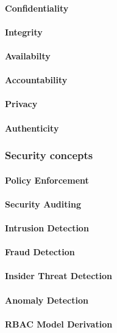 \documentclass[runningheads]{llncs}
\begin{document}
\paragraph{Confidentiality}
\paragraph{Integrity}
\paragraph{Availabilty}
\paragraph{Accountability}
\paragraph{Privacy}
\paragraph{Authenticity}
\subsubsection{Security concepts}\label{concepts}
\paragraph{Policy Enforcement}
\paragraph{Security Auditing}
\paragraph{Intrusion Detection}
\paragraph{Fraud Detection}
\paragraph{Insider Threat Detection}
\paragraph{Anomaly Detection}
\paragraph{RBAC Model Derivation}
\end{document}
